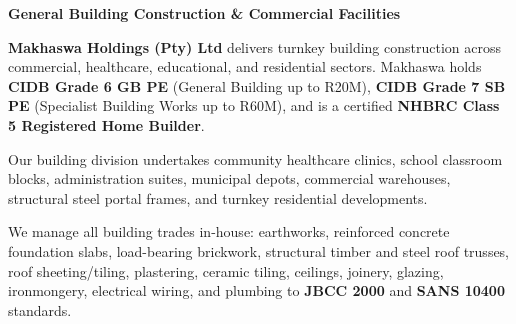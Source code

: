 \hypertarget{sec:building}{}

\noindent
\begin{minipage}[t]{0.62\textwidth}
    \vspace{0pt}
    {\large\bfseries\color{mhnavy} General Building Construction \& Commercial Facilities}
    \vspace{0.12cm}

    {\fontsize{9pt}{13pt}\selectfont\color{mhtext}
    \textbf{Makhaswa Holdings (Pty) Ltd} delivers turnkey building construction across commercial, healthcare, educational, and residential sectors. Makhaswa holds \textbf{CIDB Grade 6 GB PE} (General Building up to R20M), \textbf{CIDB Grade 7 SB PE} (Specialist Building Works up to R60M), and is a certified \textbf{NHBRC Class 5 Registered Home Builder}.
    }

    \vspace{0.22cm}

    {\fontsize{9pt}{13pt}\selectfont\color{mhtext}
    Our building division undertakes community healthcare clinics, school classroom blocks, administration suites, municipal depots, commercial warehouses, structural steel portal frames, and turnkey residential developments.
    }

    \vspace{0.22cm}

    {\fontsize{9pt}{13pt}\selectfont\color{mhtext}
    We manage all building trades in-house: earthworks, reinforced concrete foundation slabs, load-bearing brickwork, structural timber and steel roof trusses, roof sheeting/tiling, plastering, ceramic tiling, ceilings, joinery, glazing, ironmongery, electrical wiring, and plumbing to \textbf{JBCC 2000} and \textbf{SANS 10400} standards.
    }
\end{minipage}
\hfill
